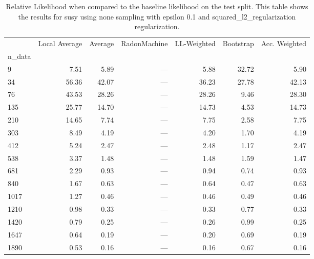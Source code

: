 \begin{table}
\centering
\caption{Relative Likelihood when compared to the baseline likelihood on the test split. This table shows the results for  susy using  none sampling with epsilon  0.1 and  squared_l2_regularization regularization.}
\label{tab:2}
\begin{tabular}{lrrrrrr}
\toprule
{} &  Local Average &  Average &  RadonMachine &  LL-Weighted &  Bootstrap &  Acc. Weighted \\
n\_data &                &          &               &              &            &                \\
\midrule
9      &           7.51 &     5.89 &           --- &         5.88 &      32.72 &           5.90 \\
34     &          56.36 &    42.07 &           --- &        36.23 &      27.78 &          42.13 \\
76     &          43.53 &    28.26 &           --- &        28.26 &       9.46 &          28.30 \\
135    &          25.77 &    14.70 &           --- &        14.73 &       4.53 &          14.73 \\
210    &          14.65 &     7.74 &           --- &         7.75 &       2.58 &           7.75 \\
303    &           8.49 &     4.19 &           --- &         4.20 &       1.70 &           4.19 \\
412    &           5.24 &     2.47 &           --- &         2.48 &       1.17 &           2.47 \\
538    &           3.37 &     1.48 &           --- &         1.48 &       1.59 &           1.47 \\
681    &           2.29 &     0.93 &           --- &         0.94 &       0.74 &           0.93 \\
840    &           1.67 &     0.63 &           --- &         0.64 &       0.47 &           0.63 \\
1017   &           1.27 &     0.46 &           --- &         0.46 &       0.49 &           0.46 \\
1210   &           0.98 &     0.33 &           --- &         0.33 &       0.77 &           0.33 \\
1420   &           0.79 &     0.25 &           --- &         0.26 &       0.99 &           0.25 \\
1647   &           0.64 &     0.19 &           --- &         0.20 &       0.69 &           0.19 \\
1890   &           0.53 &     0.16 &           --- &         0.16 &       0.67 &           0.16 \\
\bottomrule
\end{tabular}
\end{table}
